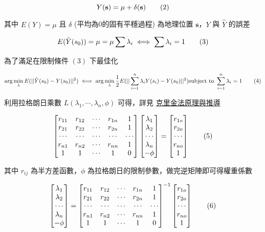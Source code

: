 \documentclass[
]{book}
\begin{document}
\[
Y(\mathbf{s}) = \mu + \delta(\mathbf{s})\tag 2
\]

其中 \(E(Y) = \mu\) 且 \(\delta\) (平均為0的固有平穩過程) 為地理位置 \(\mathbf{s}\)，\(Y\) 與 \(\hat Y\) 的誤差

\[
E(\hat Y(s_0)) = \mu = \mu\sum\lambda_i \iff \sum \lambda_i = 1 \tag 3
\]

為了滿足在限制條件 \((3)\) 下最佳化

\[
\arg\min_\lambda E(||\hat Y(s_0) - Y(s_0)||^2) \iff \arg\min_\lambda \frac{1}{2}E(||\sum_{i=1}^n\lambda_iY(s_i) -Y(s_0)||^2) \\
\mbox{subject to } \sum_{i=1}^n\lambda_i = 1 \tag 4
\]

利用拉格朗日乘數 \(L(\lambda_1,\cdots,\lambda_n,\phi)\) 可得，詳見 \href{http://www1.mate.polimi.it/~bonavent/Homepage_Luca_file/lezkrig005.pdf}{克里金法原理與推導}

\[
\begin{bmatrix}
r_{11}&r_{12}&\cdots&r_{1n}&1\\ r_{21}&r_{22}&\cdots&r_{2n}&1\\
\cdots&\cdots&\cdots&\cdots&\cdots\\
r_{n1}&r_{n2}&\cdots&r_{nn}&1\\1&1&\cdots&1&0\end{bmatrix}
\begin{bmatrix} \lambda_1\\ \lambda_2\\\cdots\\\lambda_n\\-\phi\end{bmatrix}=\begin{bmatrix} r_{1o}\\ r_{2o}\\\cdots\\r_{no}\\1\end{bmatrix} \tag 5
\]

其中 \(r_{ij}\) 為半方差函數，\(\phi\) 為拉格朗日的限制參數，做完逆矩陣即可得權重係數

\[
\begin{bmatrix} \lambda_1\\ \lambda_2\\\cdots\\\lambda_n\\-\phi\end{bmatrix}=
\begin{bmatrix}
r_{11}&r_{12}&\cdots&r_{1n}&1\\ r_{21}&r_{22}&\cdots&r_{2n}&1\\
\cdots&\cdots&\cdots&\cdots&\cdots\\
r_{n1}&r_{n2}&\cdots&r_{nn}&1\\1&1&\cdots&1&0\end{bmatrix}^{-1}
\begin{bmatrix} r_{1o}\\ r_{2o}\\\cdots\\r_{no}\\1\end{bmatrix} \tag 6
\]
\end{document}
